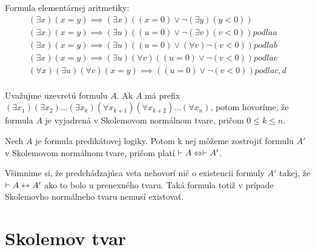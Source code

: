 \begin{priklad}
    Formula elementárnej aritmetiky:
    \begin{align}
        (\exists x) (x=y) \implies (\exists x)((x=0) \lor
                    \neg (\exists y)(y<0)) \\
        (\exists x) (x=y) \implies (\exists u)((u=0) \lor
                    \neg (\exists v)(v<0)) podla a\\
        (\exists x) (x=y) \implies (\exists u)((u=0) \lor
                    (\forall  v) \neg(v<0)) podla b\\
        (\exists x) (x=y) \implies (\exists u)(\forall v)
                ((u=0) \lor \neg(v<0)) podla e\\
        (\forall x)(\exists u)(\forall v) (x=y) \implies 
                ((u=0) \lor \neg(v<0)) podla c,d\\
    \end{align}
\end{priklad}

\begin{definicia}
  Uvažujme uzevretú formulu $A$.
  Ak $A$ má prefix $(\exists x_1)(\exists x_2) \dots (\exists x_k)
    (\forall x_{k+1}) (\forall x_{k+2}) \dots (\forall x_n)$, potom 
    hovoríme, že formula $A$ je vyjadrená v Skolemovom normálnom
    tvare, pričom $0 \le k \le n$.
\end{definicia}
\begin{veta}
    Nech $A$ je formula predikátovej logiky. Potom k nej môžeme
    zostrojiť formulu $A'$ v Skolemovom normálnom tvare, pričom platí
    $\vdash A \Leftrightarrow \vdash A'$.
\end{veta}
\begin{poznamka}
    Všimnime si, že predchádzajúca veta nehovorí nič o existencii
    formuly $A'$ takej, že $\vdash A \leftrightarrow A'$ ako to
    bolo u prenexného tvaru. Taká formula totiž v prípade Skolemovho
    normálneho tvaru nemusí existovať.
\end{poznamka}

\section{Skolemov tvar}
\todo{}

